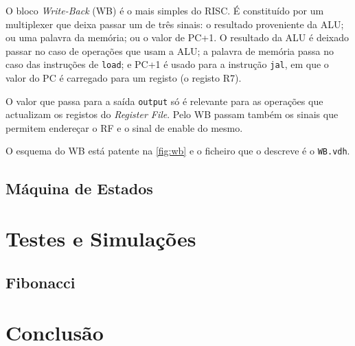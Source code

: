 \documentclass[a4paper]{article}
\begin{document}
			O bloco \textit{Write-Back} (WB) é o mais simples do \textmu RISC. É constituído por um multiplexer que deixa passar um de três sinais: o resultado proveniente da ALU; ou uma palavra da memória; ou o valor de PC+1. O resultado da ALU é deixado passar no caso de operações que usam a ALU; a palavra de memória passa no caso das instruções de \texttt{load}; e PC+1 é usado para a instrução \texttt{jal}, em que o valor do PC é carregado para um registo (o registo R7).
			
			O valor que passa para a saída \texttt{output} só é relevante para as operações que actualizam os registos do \textit{Register File}. Pelo WB passam também os sinais que permitem endereçar o RF e o sinal de enable do mesmo.
			
			O esquema do WB está patente na \autoref{fig:wb} e o ficheiro que o descreve é o \texttt{WB.vdh}.
			

		\subsection{Máquina de Estados}
		
	\section{Testes e Simulações}
	
		\subsection{Fibonacci}
		
	\section{Conclusão}
	
\end{document}
